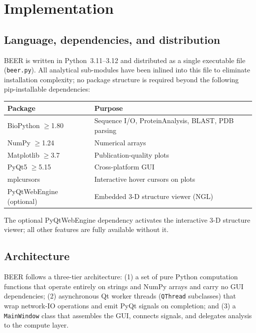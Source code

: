 \documentclass[12pt]{article}
\begin{document}
\section{Implementation}
\label{sec:impl}

\subsection{Language, dependencies, and distribution}

BEER is written in Python~3.11--3.12 and distributed as a single executable
file (\texttt{beer.py}).
All analytical sub-modules have been inlined into this file to eliminate
installation complexity; no package structure is required beyond the
following pip-installable dependencies:

\begin{center}
\begin{tabular}{ll}
\toprule
\textbf{Package} & \textbf{Purpose} \\
\midrule
BioPython $\geq$1.80 & Sequence I/O, ProteinAnalysis, BLAST, PDB parsing \\
NumPy $\geq$1.24 & Numerical arrays \\
Matplotlib $\geq$3.7 & Publication-quality plots \\
PyQt5 $\geq$5.15 & Cross-platform GUI \\
mplcursors & Interactive hover cursors on plots \\
PyQtWebEngine (optional) & Embedded 3-D structure viewer (NGL) \\
\bottomrule
\end{tabular}
\end{center}

The optional PyQtWebEngine dependency activates the interactive 3-D structure
viewer; all other features are fully available without it.

\subsection{Architecture}

BEER follows a three-tier architecture: (1) a set of pure Python computation
functions that operate entirely on strings and NumPy arrays and carry no GUI
dependencies; (2) asynchronous Qt worker threads (\texttt{QThread} subclasses)
that wrap network-IO operations and emit PyQt signals on completion; and (3) a
\texttt{MainWindow} class that assembles the GUI, connects signals, and
delegates analysis to the compute layer.
\end{document}
